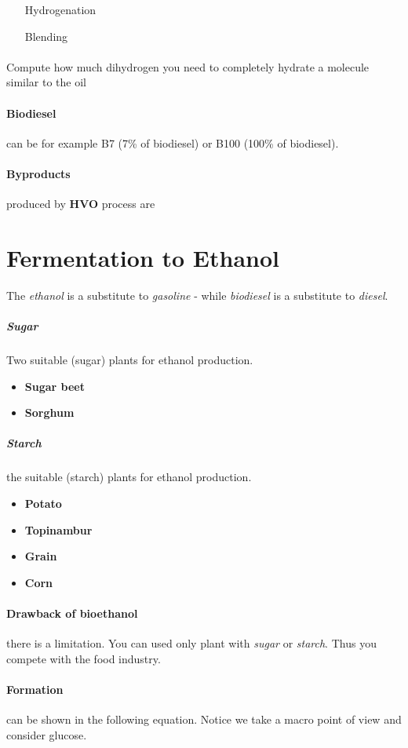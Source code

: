 \documentclass[10pt,a4paper]{article}
\begin{document}
\begin{itemize}
\item[Hydrogenation]
\item[Blending]
\end{itemize}
\paragraph{\color{red}{Exam Question}}Compute how much dihydrogen you need to completely hydrate a molecule similar to the oil

\paragraph{Biodiesel}can be for example B7 (7\% of biodiesel) or B100 (100\% of biodiesel).

\paragraph{Byproducts}produced by \textbf{HVO} process are 

\section{Fermentation to Ethanol}
The \emph{ethanol} is a substitute to \emph{gasoline} - while \emph{biodiesel} is a substitute to \textit{diesel}. 
\subparagraph{Sugar} Two suitable (sugar) plants for ethanol production.
\begin{itemize}
\item \textbf{Sugar beet}
\item \textbf{Sorghum}
\end{itemize}
\subparagraph{Starch} the suitable (starch) plants for ethanol production.
\begin{itemize}
\item \textbf{Potato}
\item \textbf{Topinambur}
\item \textbf{Grain}
\item \textbf{Corn}
\end{itemize}
\paragraph{Drawback of bioethanol}there is a limitation. You can used only plant with \emph{sugar} or \emph{starch}. Thus you compete with the food industry.

\paragraph{Formation}can be shown in the following equation. Notice we take a macro point of view and consider glucose.
\end{document}
